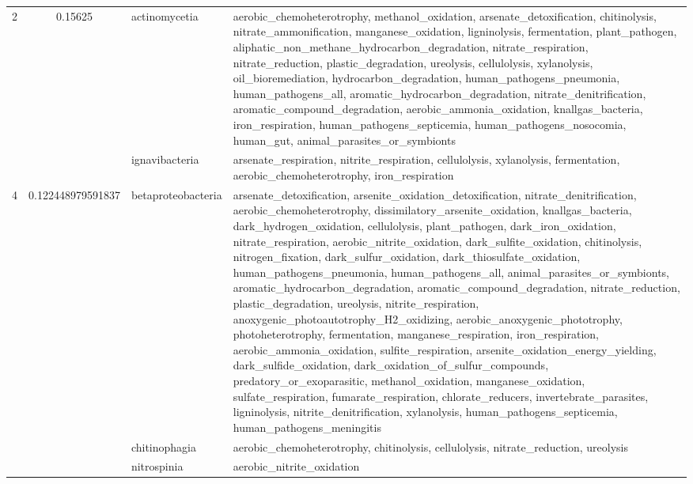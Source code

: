 \documentclass{article}
\begin{document}
\begin{longtable}{|l|c|l|>{\raggedright\arraybackslash}p{6cm}|}
\hline
2 & 0.15625 & actinomycetia & aerobic\_chemoheterotrophy, methanol\_oxidation, arsenate\_detoxification, chitinolysis, nitrate\_ammonification, manganese\_oxidation, ligninolysis, fermentation, plant\_pathogen, aliphatic\_non\_methane\_hydrocarbon\_degradation, nitrate\_respiration, nitrate\_reduction, plastic\_degradation, ureolysis, cellulolysis, xylanolysis, oil\_bioremediation, hydrocarbon\_degradation, human\_pathogens\_pneumonia, human\_pathogens\_all, aromatic\_hydrocarbon\_degradation, nitrate\_denitrification, aromatic\_compound\_degradation, aerobic\_ammonia\_oxidation, knallgas\_bacteria, iron\_respiration, human\_pathogens\_septicemia, human\_pathogens\_nosocomia, human\_gut, animal\_parasites\_or\_symbionts\\
\cline{3-4}
 &  & ignavibacteria & arsenate\_respiration, nitrite\_respiration, cellulolysis, xylanolysis, fermentation, aerobic\_chemoheterotrophy, iron\_respiration\\
\hline
4 & 0.122448979591837 & betaproteobacteria & arsenate\_detoxification, arsenite\_oxidation\_detoxification, nitrate\_denitrification, aerobic\_chemoheterotrophy, dissimilatory\_arsenite\_oxidation, knallgas\_bacteria, dark\_hydrogen\_oxidation, cellulolysis, plant\_pathogen, dark\_iron\_oxidation, nitrate\_respiration, aerobic\_nitrite\_oxidation, dark\_sulfite\_oxidation, chitinolysis, nitrogen\_fixation, dark\_sulfur\_oxidation, dark\_thiosulfate\_oxidation, human\_pathogens\_pneumonia, human\_pathogens\_all, animal\_parasites\_or\_symbionts, aromatic\_hydrocarbon\_degradation, aromatic\_compound\_degradation, nitrate\_reduction, plastic\_degradation, ureolysis, nitrite\_respiration, anoxygenic\_photoautotrophy\_H2\_oxidizing, aerobic\_anoxygenic\_phototrophy, photoheterotrophy, fermentation, manganese\_respiration, iron\_respiration, aerobic\_ammonia\_oxidation, sulfite\_respiration, arsenite\_oxidation\_energy\_yielding, dark\_sulfide\_oxidation, dark\_oxidation\_of\_sulfur\_compounds, predatory\_or\_exoparasitic, methanol\_oxidation, manganese\_oxidation, sulfate\_respiration, fumarate\_respiration, chlorate\_reducers, invertebrate\_parasites, ligninolysis, nitrite\_denitrification, xylanolysis, human\_pathogens\_septicemia, human\_pathogens\_meningitis\\
\cline{3-4}
 &  & chitinophagia & aerobic\_chemoheterotrophy, chitinolysis, cellulolysis, nitrate\_reduction, ureolysis\\
\cline{3-4}
 &  & nitrospinia & aerobic\_nitrite\_oxidation\\
\hline

\end{longtable}
\end{document}
